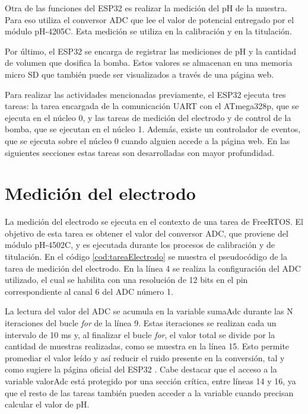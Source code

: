 Otra de las funciones del ESP32 es realizar la medición del pH de la muestra. Para eso utiliza el conversor ADC que lee el valor de potencial entregado por el módulo pH-4205C. Esta medición se utiliza en la calibración y en la titulación.

Por último, el ESP32 se encarga de registrar las mediciones de pH y la cantidad de volumen que dosifica la bomba. Estos valores se almacenan en una memoria micro SD que también puede ser visualizados a través de una página web.

Para realizar las actividades mencionadas previamente, el ESP32 ejecuta tres tareas: la tarea encargada de la comunicación UART con el ATmega328p, que se ejecuta en el núcleo 0, y las tareas de medición del electrodo y de control de la bomba, que se ejecutan en el núcleo 1. Además, existe un controlador de eventos, que se ejecuta sobre el núcleo 0 cuando alguien accede a la página web.
En las siguientes secciones estas tareas son desarrolladas con mayor profundidad.

\section{Medición del electrodo}

La medición del electrodo se ejecuta en el contexto de una tarea de FreeRTOS. El objetivo de esta tarea es obtener el valor del conversor ADC, que proviene del módulo pH-4502C, y es ejecutada durante los procesos de calibración y de titulación. En el código \ref{cod:tareaElectrodo} se muestra el pseudocódigo de la tarea de medición del electrodo. En la línea 4 se realiza la configuración del ADC utilizado, el cual se habilita con una resolución de 12 bits en el pin correspondiente al canal 6 del ADC número 1.

La lectura del valor del ADC se acumula en la variable sumaAdc durante las N iteraciones del bucle \textit{for} de la línea 9. Estas iteraciones se realizan cada un intervalo de 10 ms y, al finalizar el bucle \textit{for}, el valor total se divide por la cantidad de muestras realizadas, como se muestra en la línea 15. Esto permite promediar el valor leído y así reducir el ruido presente en la conversión, tal y como sugiere la página oficial del ESP32 \citep{WEBSITE:2}. Cabe destacar que el acceso a la variable valorAdc está protegido por una sección crítica, entre líneas 14 y 16, ya que el resto de las tareas también pueden acceder a la variable cuando precisan calcular el valor de pH.

